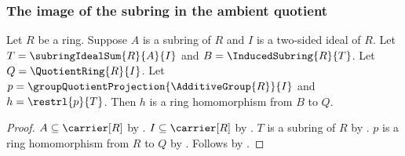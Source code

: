\subsubsection{The image of the subring in the ambient quotient}

\begin{theorem}\label{ring_second_isomorphism_ambient_restriction_hom}
    Let $R$ be a ring.
    Suppose $A$ is a subring of $R$ and
        $I$ is a two-sided ideal of $R$.
    Let $T=\subringIdealSum{R}{A}{I}$ and
        $B=\InducedSubring{R}{T}$.
    Let $Q=\QuotientRing{R}{I}$.
    Let $p=\groupQuotientProjection{\AdditiveGroup{R}}{I}$ and
        $h=\restrl{p}{T}$.
    Then $h$ is a ring homomorphism from $B$ to $Q$.
\end{theorem}
\begin{proof}
    $A\subseteq\carrier[R]$ by .
    $I\subseteq\carrier[R]$ by
        .
    $T$ is a subring of $R$ by .
    $p$ is a ring homomorphism from $R$ to $Q$ by
        .
    Follows by .
\end{proof}

